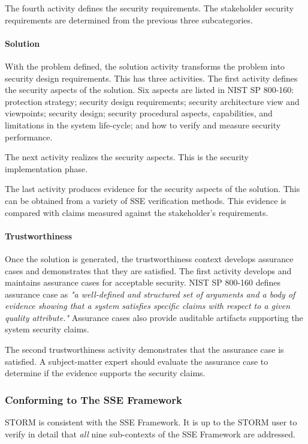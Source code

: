 \documentclass[../../main/main.tex]{subfiles}
\begin{document}
The fourth activity defines the security requirements.  The stakeholder security requirements are determined from the previous three subcategories.

\paragraph*{Solution}
With the problem defined, the solution activity transforms the problem into security design requirements.  This has three activities.  The first activity defines the security aspects of the solution. Six aspects are listed in NIST SP 800-160: protection strategy; security design requirements; security architecture view and viewpoints; security design; security procedural aspects, capabilities, and limitations in the system life-cycle; and how to verify and measure security performance. 

The next activity realizes the security aspects.  This is the security implementation phase.

The last activity produces evidence for the security aspects of the solution. This can be obtained from a variety of SSE verification methods.  This evidence is compared with claims measured against the stakeholder's requirements.

\paragraph*{Trustworthiness}
Once the solution is generated, the trustworthiness context develops assurance cases and demonstrates that they are satisfied.  The first activity develops and maintains assurance cases for acceptable security.  NIST SP 800-160 defines assurance case as \textit{"a well-defined and structured set of arguments and a body of evidence showing that a system satisfies specific claims with respect to a given quality attribute."}  Assurance cases also provide auditable artifacts supporting the system security claims.

The second trustworthiness activity demonstrates that the assurance case is satisfied.  A subject-matter expert should evaluate the assurance case to determine if the evidence supports the security claims.

\subsubsection{Conforming to The SSE Framework}
STORM is consistent with the SSE Framework.  It is up to the STORM user to verify in detail that \textit{all} nine sub-contexts of the SSE Framework are addressed.  
\end{document}
